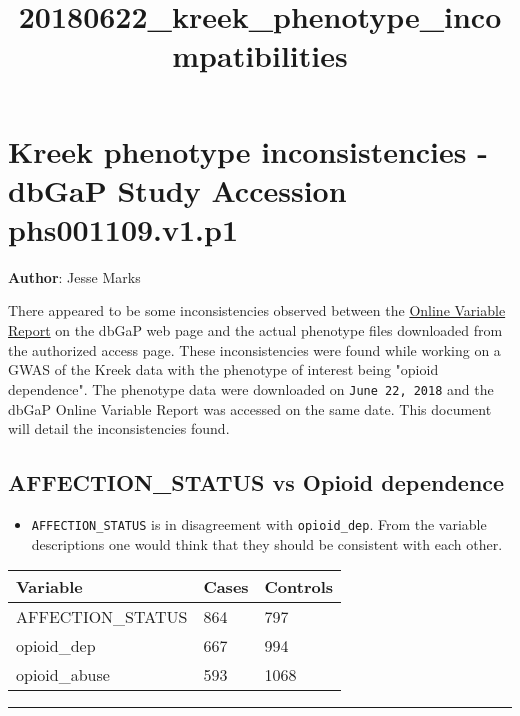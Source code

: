 \documentclass[11pt]{article}
\title{20180622\_kreek\_phenotype\_incompatibilities}
\providecommand{\tightlist}{%
      \setlength{\itemsep}{0pt}\setlength{\parskip}{0pt}}
\begin{document}
    
    
    \maketitle
    
    

    
    \section{Kreek phenotype inconsistencies - dbGaP Study Accession
phs001109.v1.p1}\label{kreek-phenotype-inconsistencies---dbgap-study-accession-phs001109.v1.p1}

\textbf{Author}: Jesse Marks

There appeared to be some inconsistencies observed between the
\href{https://www.ncbi.nlm.nih.gov/projects/gap/cgi-bin/dataset.cgi?study_id=phs001109.v1.p1\&phv=261892\&phd=6837\&pha=\&pht=5447\&phvf=1\&phdf=\&phaf=\&phtf=1\&dssp=1\&consent=\&temp=1}{Online
Variable Report} on the dbGaP web page and the actual phenotype files
downloaded from the authorized access page. These inconsistencies were
found while working on a GWAS of the Kreek data with the phenotype of
interest being "opioid dependence". The phenotype data were downloaded
on \texttt{June\ 22,\ 2018} and the dbGaP Online Variable Report was
accessed on the same date. This document will detail the inconsistencies
found.

    \subsection{AFFECTION\_STATUS vs Opioid
dependence}\label{affection_status-vs-opioid-dependence}

\begin{itemize}
\tightlist
\item
  \texttt{AFFECTION\_STATUS} is in disagreement with
  \texttt{opioid\_dep}. From the variable descriptions one would think
  that they should be consistent with each other.
\end{itemize}

\begin{longtable}[]{@{}lll@{}}
\toprule
Variable & Cases & Controls\tabularnewline
\midrule
\endhead
AFFECTION\_STATUS & 864 & 797\tabularnewline
opioid\_dep & 667 & 994\tabularnewline
opioid\_abuse & 593 & 1068\tabularnewline
\bottomrule
\end{longtable}

\begin{center}\rule{0.5\linewidth}{\linethickness}\end{center}
\end{document}
